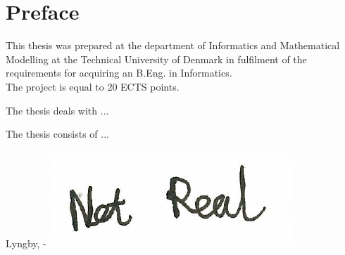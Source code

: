 \chapter{Preface}

This thesis was prepared at the department of Informatics and Mathematical Modelling at the Technical University of Denmark in fulfilment of the
requirements for acquiring an B.Eng. in Informatics. \\
The project is equal to 20 ECTS points.

The thesis deals with ...

The thesis consists of ...
\vspace{20mm}
\begin{center}
    \hspace{20mm} Lyngby, \thesishandin-\thesisyear
    \vspace{5mm}
    \newline
    \includegraphics[scale=0.5]{figures/SignatureDummy}
\end{center}
\begin{flushright}
    \thesisauthor
\end{flushright}
